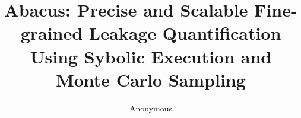 \documentclass[10pt,conference]{IEEEtran}
\newcommand{\tool}{TANA}
\renewcommand{\tool}{CleverHans}
\renewcommand{\tool}{Cygne}
\renewcommand{\tool}{Do-Re-Mi}
\renewcommand{\tool}{Ta-fa Te-fe}
\renewcommand{\tool}{Ti-ri-ti-ri}
\renewcommand{\tool}{Du-Ta-De-Ta}
\renewcommand{\tool}{\textsf{Abacus}}
\begin{document}
%
\title{\tool{}: Precise and Scalable Fine-grained %
  Leakage Quantification %
  Using %
  Sybolic Execution and Monte Carlo Sampling}
\author{Anonymous}







\maketitle
\end{document}
